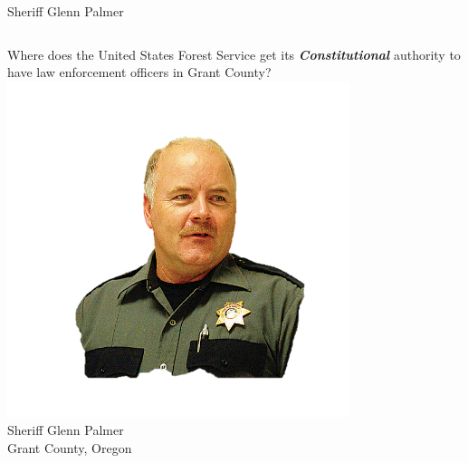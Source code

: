 \begin{frame}{Sheriff Glenn Palmer}
    \begin{columns}[onlytextwidth]
            \centering
            { \Large Where does the United States Forest Service get its
            \textbf{\emph{Constitutional}} authority to have law enforcement
            officers in Grant County? }
            \centering
            \includegraphics[width=0.75\textwidth]{img/glenn-palmer.png}
            \\ Sheriff Glenn Palmer
            \\ Grant County, Oregon
    \end{columns}
\end{frame}

